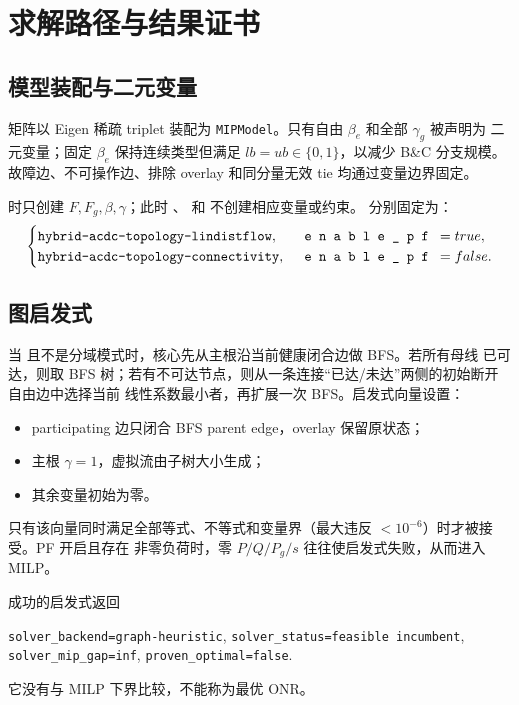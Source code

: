 
\section{求解路径与结果证书}\label{sec:nr-solver}

\subsection{模型装配与二元变量}

矩阵以 Eigen 稀疏 triplet 装配为 \texttt{MIPModel}。只有自由 $\beta_e$ 和全部 $\gamma_g$ 被声明为
二元变量；固定 $\beta_e$ 保持连续类型但满足 $lb=ub\in\{0,1\}$，以减少 B\&C 分支规模。
故障边、不可操作边、排除 overlay 和同分量无效 tie 均通过变量边界固定。

 时只创建 $F,F_g,\beta,\gamma$；此时
、 和  不创建相应变量或约束。
 分别固定为：
\begin{equation}
\begin{cases}
\texttt{hybrid-acdc-topology-lindistflow},&\fld{enable\_pf}=true,\\
\texttt{hybrid-acdc-topology-connectivity},&\fld{enable\_pf}=false.
\end{cases}
\end{equation}

\subsection{图启发式}

当  且不是分域模式时，核心先从主根沿当前健康闭合边做 BFS。若所有母线
已可达，则取 BFS 树；若有不可达节点，则从一条连接“已达/未达”两侧的初始断开自由边中选择当前
线性系数最小者，再扩展一次 BFS。启发式向量设置：
\begin{itemize}
  \item participating 边只闭合 BFS parent edge，overlay 保留原状态；
  \item 主根 $\gamma=1$，虚拟流由子树大小生成；
  \item 其余变量初始为零。
\end{itemize}
只有该向量同时满足全部等式、不等式和变量界（最大违反 $<10^{-6}$）时才被接受。PF 开启且存在
非零负荷时，零 $P/Q/P_g/s$ 往往使启发式失败，从而进入 MILP。

成功的启发式返回
\begin{center}
\texttt{solver\_backend=graph-heuristic},\quad
\texttt{solver\_status=feasible incumbent},\quad
\texttt{solver\_mip\_gap=inf},\quad
\texttt{proven\_optimal=false}.
\end{center}
它没有与 MILP 下界比较，不能称为最优 ONR。

